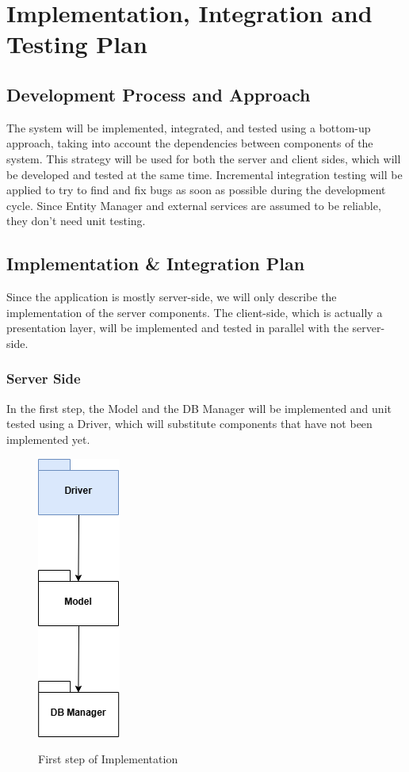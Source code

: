 \documentclass[a4paper,12pt]{article}
\begin{document}
\section{Implementation, Integration and Testing Plan}

\subsection{Development Process and Approach}
The system will be implemented, integrated, and tested using a bottom-up approach, taking
into account the dependencies between components of the system. This strategy will be used
for both the server and client sides, which will be developed and tested at the same time.
Incremental integration testing will be applied to try to find and fix bugs as soon as possible
during the development cycle. Since Entity Manager and external services are assumed to be
reliable, they don't need unit testing.
\subsection{Implementation \& Integration Plan}
Since the application is mostly server-side, we will only describe the implementation of
the server components. The client-side, which is actually a presentation layer, will be
implemented and tested in parallel with the server-side.
\subsubsection{Server Side}
In the first step, the Model and the DB Manager will be implemented and unit tested using a Driver, which will substitute components that have not been implemented yet.

\begin{figure}[H]
\centering
\includegraphics[scale = 0.9]{DD_figures/ImplementationDiagrams/FirstStep.png}\\
\caption{First step of Implementation}
\end{figure}
\newpage
\end{document}

